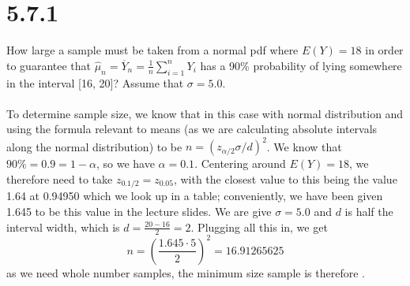 \documentclass{article}
\begin{document}
{\section*{5.7.1}
How large a sample must be taken from a normal pdf where \(E(Y) = 18\) in order to guarantee that \(\hat{\mu}_n = \overline{Y}_n = \frac{1}{n} \sum_{i=1}^{n} Y_i\) has a 90\% probability of lying somewhere in the interval [16, 20]? Assume that \(\sigma = 5.0\).
\\
\\
To determine sample size, we know that in this case with normal distribution and using the formula relevant to means (as we are calculating absolute intervals along the normal distribution) to be \(n = (z_{\alpha/2}\sigma/d)^2\). We know that \(90\% = 0.9 = 1 - \alpha\), so we have \(\alpha = 0.1\). Centering around \(E(Y) = 18\), we therefore need to take \(z_{0.1 / 2} = z_{0.05}\), with the closest value to this being the value 1.64 at 0.94950 which we look up in a table; conveniently, we have been given 1.645 to be this value in the lecture slides. We are give \(\sigma = 5.0\) and \(d\) is half the interval width, which is \(d = \frac{20-16}{2} = 2\). Plugging all this in, we get 
\[
n = (\frac{1.645 \cdot 5}{2})^2 = 16.91265625
\]
as we need whole number samples, the minimum size sample is therefore .

}
\end{document}
